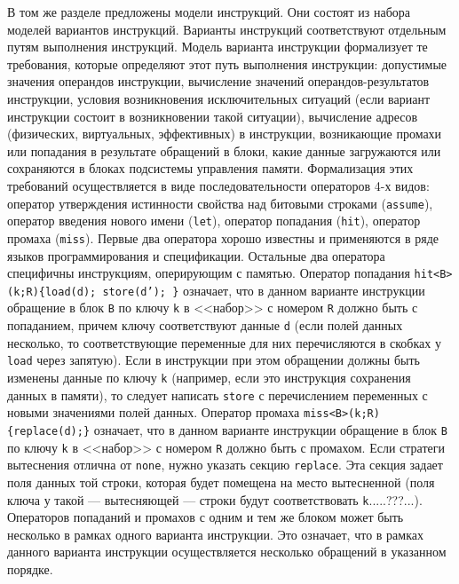 \documentclass[14pt,autoref,href
,facsimile
]{disser}
\begin{document}
В том же разделе предложены модели инструкций. Они состоят из набора моделей вариантов инструкций. Варианты инструкций соответствуют отдельным путям выполнения инструкций. Модель варианта инструкции формализует те требования, которые определяют этот путь выполнения инструкции: допустимые значения операндов инструкции, вычисление значений операндов-результатов инструкции, условия возникновения исключительных ситуаций (если вариант инструкции состоит в возникновении такой ситуации), вычисление адресов (физических, виртуальных, эффективных) в инструкции, возникающие промахи или попадания в результате обращений в блоки, какие данные загружаются или сохраняются в блоках подсистемы управления памяти. Формализация этих требований осуществляется в виде последовательности операторов 4-х видов: оператор утверждения истинности свойства над битовыми строками (\texttt{assume}), оператор введения нового имени (\texttt{let}), оператор попадания (\texttt{hit}), оператор промаха (\texttt{miss}). Первые два оператора хорошо известны и применяются в ряде языков программирования и спецификации. Остальные два оператора специфичны инструкциям, оперирующим с памятью. Оператор попадания \texttt{hit<B>(k;R)\{load(d); store(d'); \}} означает, что в данном варианте инструкции обращение в блок \texttt{B} по ключу \texttt{k} в <<набор>> с номером \texttt{R} должно быть с попаданием, причем ключу соответствуют данные \texttt{d} (если полей данных несколько, то соответствующие переменные для них перечисляются в скобках у \texttt{load} через запятую). Если в инструкции при этом обращении должны быть изменены данные по ключу \texttt{k} (например, если это инструкция сохранения данных в памяти), то следует написать \texttt{store} с перечислением переменных с новыми значениями полей данных. Оператор промаха \texttt{miss<B>(k;R)\{replace(d);\}} означает, что в данном варианте инструкции обращение в блок \texttt{B} по ключу \texttt{k} в <<набор>> с номером \texttt{R} должно быть с промахом. Если стратеги вытеснения отлична от \texttt{none}, нужно указать секцию \texttt{replace}. Эта секция задает поля данных той строки, которая будет помещена на место вытесненной (поля ключа у такой --- вытесняющей --- строки будут соответствовать \texttt{k}.....???...). Операторов попаданий и промахов с одним и тем же блоком может быть несколько в рамках одного варианта инструкции. Это означает, что в рамках данного варианта инструкции осуществляется несколько обращений в указанном порядке.
\end{document}
